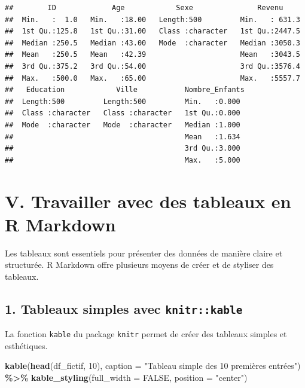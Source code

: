 \documentclass[
]{article}
\newenvironment{Shaded}{\begin{snugshade}}{\end{snugshade}}
\newcommand{\AttributeTok}[1]{\textcolor[rgb]{0.13,0.29,0.53}{#1}}
\newcommand{\ConstantTok}[1]{\textcolor[rgb]{0.56,0.35,0.01}{#1}}
\newcommand{\DecValTok}[1]{\textcolor[rgb]{0.00,0.00,0.81}{#1}}
\newcommand{\FunctionTok}[1]{\textcolor[rgb]{0.13,0.29,0.53}{\textbf{#1}}}
\newcommand{\NormalTok}[1]{#1}
\newcommand{\SpecialCharTok}[1]{\textcolor[rgb]{0.81,0.36,0.00}{\textbf{#1}}}
\newcommand{\StringTok}[1]{\textcolor[rgb]{0.31,0.60,0.02}{#1}}
\begin{document}
\begin{verbatim}
##        ID             Age            Sexe               Revenu      
##  Min.   :  1.0   Min.   :18.00   Length:500         Min.   : 631.3  
##  1st Qu.:125.8   1st Qu.:31.00   Class :character   1st Qu.:2447.5  
##  Median :250.5   Median :43.00   Mode  :character   Median :3050.3  
##  Mean   :250.5   Mean   :42.39                      Mean   :3043.5  
##  3rd Qu.:375.2   3rd Qu.:54.00                      3rd Qu.:3576.4  
##  Max.   :500.0   Max.   :65.00                      Max.   :5557.7  
##   Education            Ville           Nombre_Enfants 
##  Length:500         Length:500         Min.   :0.000  
##  Class :character   Class :character   1st Qu.:0.000  
##  Mode  :character   Mode  :character   Median :1.000  
##                                        Mean   :1.634  
##                                        3rd Qu.:3.000  
##                                        Max.   :5.000
\end{verbatim}

\hypertarget{v.-travailler-avec-des-tableaux-en-r-markdown}{%
\section{V. Travailler avec des tableaux en R
Markdown}\label{v.-travailler-avec-des-tableaux-en-r-markdown}}

Les tableaux sont essentiels pour présenter des données de manière
claire et structurée. R Markdown offre plusieurs moyens de créer et de
styliser des tableaux.

\hypertarget{tableaux-simples-avec-knitrkable}{%
\subsection{\texorpdfstring{1. Tableaux simples avec
\texttt{knitr::kable}}{1. Tableaux simples avec knitr::kable}}\label{tableaux-simples-avec-knitrkable}}

La fonction \texttt{kable} du package \texttt{knitr} permet de créer des
tableaux simples et esthétiques.

\begin{Shaded}
\begin{Highlighting}[]
\FunctionTok{kable}\NormalTok{(}\FunctionTok{head}\NormalTok{(df\_fictif, }\DecValTok{10}\NormalTok{), }\AttributeTok{caption =} \StringTok{"Tableau simple des 10 premières entrées"}\NormalTok{) }\SpecialCharTok{\%\textgreater{}\%}
  \FunctionTok{kable\_styling}\NormalTok{(}\AttributeTok{full\_width =} \ConstantTok{FALSE}\NormalTok{, }\AttributeTok{position =} \StringTok{"center"}\NormalTok{)}
\end{Highlighting}
\end{Shaded}
\end{document}
